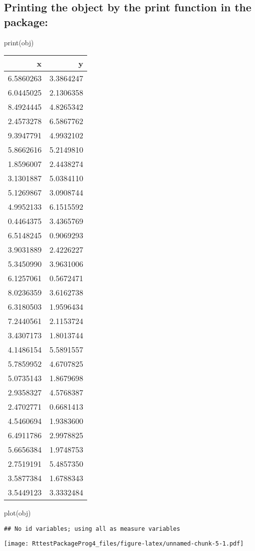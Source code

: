 \documentclass[
]{article}
\newenvironment{Shaded}{\begin{snugshade}}{\end{snugshade}}
\newcommand{\FunctionTok}[1]{\textcolor[rgb]{0.00,0.00,0.00}{#1}}
\newcommand{\NormalTok}[1]{#1}
\begin{document}
\hypertarget{printing-the-object-by-the-print-function-in-the-package}{%
\subsection{Printing the object by the print function in the
package:}\label{printing-the-object-by-the-print-function-in-the-package}}

\begin{Shaded}
\begin{Highlighting}[]
\FunctionTok{print}\NormalTok{(obj)}
\end{Highlighting}
\end{Shaded}

\begin{tabular}{r|r}
\hline
x & y\\
\hline
6.5860263 & 3.3864247\\
\hline
6.0445025 & 2.1306358\\
\hline
8.4924445 & 4.8265342\\
\hline
2.4573278 & 6.5867762\\
\hline
9.3947791 & 4.9932102\\
\hline
5.8662616 & 5.2149810\\
\hline
1.8596007 & 2.4438274\\
\hline
3.1301887 & 5.0384110\\
\hline
5.1269867 & 3.0908744\\
\hline
4.9952133 & 6.1515592\\
\hline
0.4464375 & 3.4365769\\
\hline
6.5148245 & 0.9069293\\
\hline
3.9031889 & 2.4226227\\
\hline
5.3450990 & 3.9631006\\
\hline
6.1257061 & 0.5672471\\
\hline
8.0236359 & 3.6162738\\
\hline
6.3180503 & 1.9596434\\
\hline
7.2440561 & 2.1153724\\
\hline
3.4307173 & 1.8013744\\
\hline
4.1486154 & 5.5891557\\
\hline
5.7859952 & 4.6707825\\
\hline
5.0735143 & 1.8679698\\
\hline
2.9358327 & 4.5768387\\
\hline
2.4702771 & 0.6681413\\
\hline
4.5460694 & 1.9383600\\
\hline
6.4911786 & 2.9978825\\
\hline
5.6656384 & 1.9748753\\
\hline
2.7519191 & 5.4857350\\
\hline
3.5877384 & 1.6788343\\
\hline
3.5449123 & 3.3332484\\
\hline
\end{tabular}

\begin{Shaded}
\begin{Highlighting}[]
\FunctionTok{plot}\NormalTok{(obj)}
\end{Highlighting}
\end{Shaded}

\begin{verbatim}
## No id variables; using all as measure variables
\end{verbatim}

\texttt{[image: RttestPackageProg4\_files/figure-latex/unnamed-chunk-5-1.pdf]}
\end{document}

